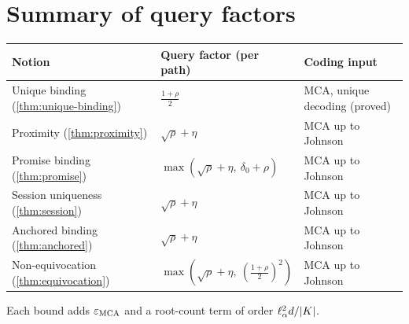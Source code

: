 \section{Summary of query factors}

\begin{center}
\renewcommand{\arraystretch}{1.3}
\begin{tabular}{lll}
\hline
Notion & Query factor (per path) & Coding input\\
\hline
Unique binding (\ref{thm:unique-binding}) & $\frac{1+\rho}2$ & MCA, unique decoding (proved)\\
Proximity (\ref{thm:proximity}) & $\sqrt\rho+\eta$ & MCA up to Johnson\\
Promise binding (\ref{thm:promise}) & $\max(\sqrt\rho+\eta,\ \delta_0+\rho)$ & MCA up to Johnson\\
Session uniqueness (\ref{thm:session}) & $\sqrt\rho+\eta$ & MCA up to Johnson\\
Anchored binding (\ref{thm:anchored}) & $\sqrt\rho+\eta$ & MCA up to Johnson\\
Non-equivocation (\ref{thm:equivocation}) & $\max(\sqrt\rho+\eta,\ (\frac{1+\rho}2)^2)$ & MCA up to Johnson\\
\hline
\end{tabular}
\end{center}
Each bound adds $\varepsilon_{\mathrm{MCA}}$ and a root-count term of order $\ell_\alpha^2d/|K|$.
